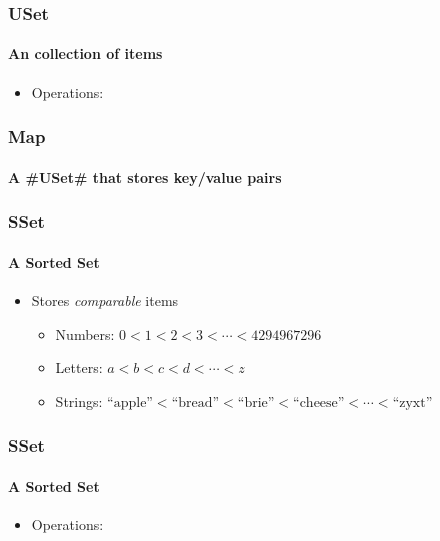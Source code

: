 \documentclass[aspectratio=169,xcolor=dvipsnames]{beamer}
\begin{document}


\begin{frame}
  \frametitle{USet}
  \framesubtitle{An  collection of  items}
  \begin{itemize}
    \item<+-> Operations: %
  \end{itemize}
     \begin{center}
     \end{center}

\end{frame}

\begin{frame}
  \frametitle{Map}
  \framesubtitle{A #USet# that stores key/value pairs}
 
     \begin{center}
     \end{center}
\end{frame}


\begin{frame}
  \frametitle{SSet}
  \framesubtitle{A Sorted Set}
 
  \begin{itemize}
    \item<+->Stores \emph{comparable} items
    \begin{itemize}
       \item<+-> Numbers: $0 < 1 < 2 < 3 < \cdots < 4294967296$
       \item<+-> Letters: $a < b < c < d < \cdots < z$
       \item<+-> Strings: $\text{``apple''} < \text{``bread''} < \text{``brie''} 
                           < \text{``cheese''} < \cdots < \text{``zyxt''}$
    \end{itemize}
  \end{itemize}
\end{frame}

\begin{frame}
  \frametitle{SSet}
  \framesubtitle{A Sorted Set}

  \begin{itemize}
    \item<+-> Operations: %
  \end{itemize}
  \begin{center}
  \end{center}
\end{frame}

\titler{}
\end{document}
